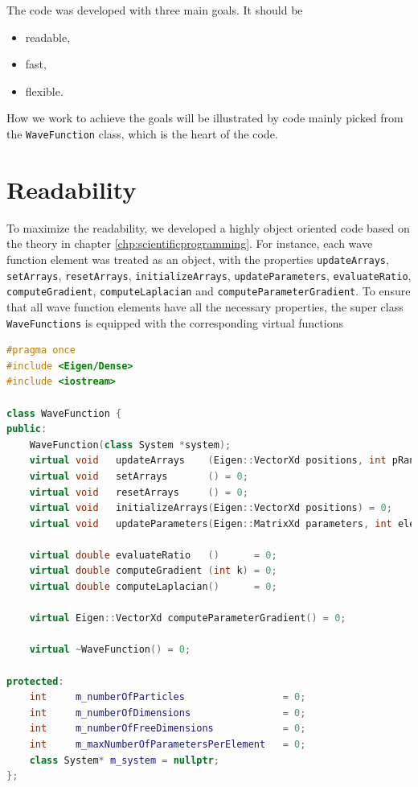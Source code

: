 The code was developed with three main goals. It should be
\begin{itemize}
	\itemsep-0.3em
	\item readable,
	\item fast,
	\item flexible.
\end{itemize}

How we work to achieve the goals will be illustrated by code mainly picked from the \texttt{WaveFunction} class, which is the heart of the code. 

\section{Readability}
To maximize the readability, we developed a highly object oriented code based on the theory in chapter \eqref{chp:scientificprogramming}. For instance, each wave function element was treated as an object, with the properties \texttt{updateArrays}, \texttt{setArrays}, \texttt{resetArrays}, \texttt{initializeArrays}, \texttt{updateParameters}, \texttt{evaluateRatio}, \texttt{computeGradient}, \texttt{computeLaplacian} and \newline\texttt{computeParameterGradient}. To ensure that all wave function elements have all the necessary properties, the super class \texttt{WaveFunctions} is equipped with the corresponding virtual functions
\lstset{basicstyle=\scriptsize}
\begin{lstlisting}[language=c++,caption={\texttt{wavefunction.h}}]
#pragma once
#include <Eigen/Dense>
#include <iostream>

class WaveFunction {
public:
    WaveFunction(class System *system);
    virtual void   updateArrays    (Eigen::VectorXd positions, int pRand)  = 0;
    virtual void   setArrays       () = 0;
    virtual void   resetArrays     () = 0;
    virtual void   initializeArrays(Eigen::VectorXd positions) = 0;
    virtual void   updateParameters(Eigen::MatrixXd parameters, int elementNumber) = 0;
    
    virtual double evaluateRatio   ()      = 0;
    virtual double computeGradient (int k) = 0;
    virtual double computeLaplacian()      = 0;
    
    virtual Eigen::VectorXd computeParameterGradient() = 0;

    virtual ~WaveFunction() = 0;

protected:
    int     m_numberOfParticles                 = 0;
    int     m_numberOfDimensions                = 0;
    int     m_numberOfFreeDimensions            = 0;
    int     m_maxNumberOfParametersPerElement   = 0;
    class System* m_system = nullptr;
};
\end{lstlisting}
